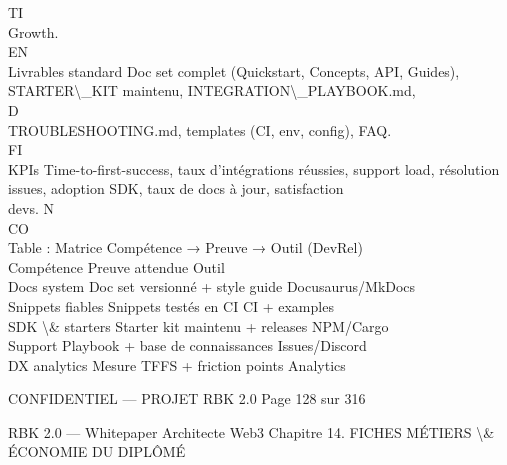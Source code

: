 \vspace{0.5em}
\vspace{0.5em}
\vspace{0.5em}
\vspace{0.5em}
TI\\
Growth.\\
\vspace{0.5em}
\vspace{0.5em}
\vspace{0.5em}
\vspace{0.5em}
EN\\
Livrables standard  Doc set complet (Quickstart, Concepts, API, Guides), STARTER\textbackslash{}_KIT maintenu, INTEGRATION\textbackslash{}_PLAYBOOK.md,\\
\vspace{0.5em}
\vspace{0.5em}
\vspace{0.5em}
\vspace{0.5em}
D\\
TROUBLESHOOTING.md, templates (CI, env, config), FAQ.\\
\vspace{0.5em}
\vspace{0.5em}
\vspace{0.5em}
\vspace{0.5em}
FI\\
KPIs Time-to-first-success, taux d’intégrations réussies, support load, résolution issues, adoption SDK, taux de docs à jour, satisfaction\\
devs.                                            N\\
CO\\
Table : Matrice Compétence → Preuve → Outil (DevRel)\\
\vspace{0.5em}
Compétence       Preuve attendue                  Outil\\
Docs system      Doc set versionné + style guide  Docusaurus/MkDocs\\
Snippets fiables Snippets testés en CI            CI + examples\\
SDK \textbackslash{}& starters Starter kit maintenu + releases    NPM/Cargo\\
Support          Playbook + base de connaissances Issues/Discord\\
DX analytics     Mesure TFFS + friction points    Analytics\\
\vspace{0.5em}
\vspace{0.5em}
\vspace{0.5em}
\vspace{0.5em}
\begin{confidential}CONFIDENTIEL — PROJET RBK 2.0                               Page 128 sur 316\end{confidential}
RBK 2.0 — Whitepaper Architecte Web3                                                   Chapitre 14. FICHES MÉTIERS \textbackslash{}& ÉCONOMIE DU DIPLÔMÉ\\
\vspace{0.5em}
\vspace{0.5em}
\vspace{0.5em}
